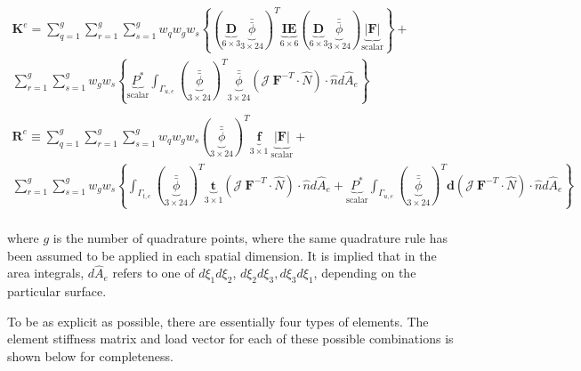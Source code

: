 \documentclass[10pt]{article}
\begin{document}
\begin{equation}
\label{eq:FEWeakForm_element3}
\begin{aligned}
\textbf{K}^e=\sum_{q=1}^g\sum_{r=1}^g\sum_{s=1}^gw_qw_gw_s\left\{(\underbrace{\textbf{D}}_{6\times3}\underbrace{\bar{\bar{\phi}}}_{3\times24})^T\underbrace{\textbf{IE}}_{6\times6}(\underbrace{\textbf{D}}_{6\times3}\underbrace{\bar{\bar{\phi}}}_{3\times24})\underbrace{|\textbf{F}|}_\text{scalar}\right\} +\quad\\
\sum_{r=1}^g\sum_{s=1}^gw_gw_s\left\{\underbrace{P^{*}}_\text{scalar}\int_{\Gamma_{u,e}}(\underbrace{\bar{\bar{\phi}}}_{3\times24})^T\underbrace{\bar{\bar{\phi}}}_{3\times24}(\mathscr{J}\ \textbf{F}^{-T}\cdot\hat{N})\cdot\hat{n}d\hat{A}_e\right\}\\
\ \\
\textbf{R}^e\equiv\sum_{q=1}^g\sum_{r=1}^g\sum_{s=1}^gw_qw_gw_s(\underbrace{\bar{\bar{\phi}}}_{3\times24})^T\underbrace{\textbf{f}}_{3\times1}\ \underbrace{|\textbf{F}|}_\text{scalar}+\quad\\
\sum_{r=1}^g\sum_{s=1}^gw_gw_s\left\{\int_{\Gamma_{t,e}}(\underbrace{\bar{\bar{\phi}}}_{3\times24})^T\underbrace{\textbf{t}}_{3\times1}(\mathscr{J}\ \textbf{F}^{-T}\cdot\hat{N})\cdot\hat{n}d\hat{A}_e+\underbrace{P^{*}}_\text{scalar}\int_{\Gamma_{u,e}}(\underbrace{\bar{\bar{\phi}}}_{3\times24})^T\textbf{d}(\mathscr{J}\ \textbf{F}^{-T}\cdot\hat{N})\cdot\hat{n}d\hat{A}_e\right\}\\
\end{aligned}
\end{equation}

where \(g\) is the number of quadrature points, where the same quadrature rule has been assumed to be applied in each spatial dimension. It is implied that in the area integrals, \(d\hat{A}_e\) refers to one of \(d\xi_1d\xi_2\), \(d\xi_2d\xi_3, d\xi_3d\xi_1\), depending on the particular surface.

To be as explicit as possible, there are essentially four types of elements. The element stiffness matrix and load vector for each of these possible combinations is shown below for completeness.
\end{document}
